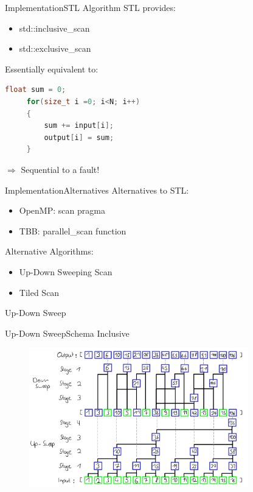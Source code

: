 \begin{frame}[fragile]{Implementation}{STL Algorithm}
    STL provides:
    \begin{itemize}
        \item std::inclusive\_scan
        \item std::exclusive\_scan
    \end{itemize}
    \vspace{10pt}
    Essentially equivalent to:\\
    
     \begin{lstlisting}[language=C++, frame=single, gobble=4]
     float sum = 0;
     for(size_t i =0; i<N; i++)
     {
         sum += input[i];
         output[i] = sum;
     }
     \end{lstlisting}
    \begin{center} $\Rightarrow$ Sequential to a fault! \end{center}
 
\end{frame} 

\begin{frame}{Implementation}{Alternatives}
    Alternatives to STL:
    \begin{itemize}
        \item OpenMP: scan pragma
        \item TBB: parallel\_scan function
    \end{itemize}
    Alternative Algorithms:
    \begin{itemize}
     \item Up-Down Sweeping Scan
     \item Tiled Scan
    \end{itemize}
\end{frame} 

\begin{frame}{Up-Down Sweep}
\end{frame}

\begin{frame}{Up-Down Sweep}{Schema Inclusive}
 \begin{figure}
  \centering
  \includegraphics[width=0.85\textwidth]{wiki/InclusiveUpDown}
 \end{figure}
\end{frame}

